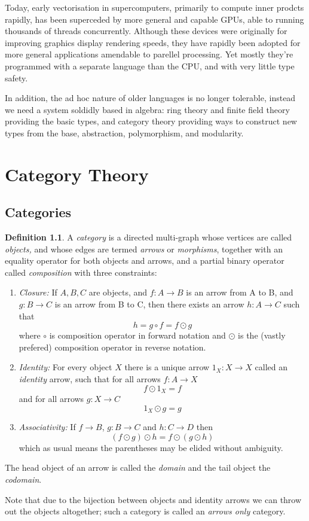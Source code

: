 \documentclass[oneside]{book}
\theoremstyle{plain}
\theoremstyle{definition}
\newtheorem{definition}{Definition}
\theoremstyle{plain}
\begin{document}
Today, early vectorisation in supercomputers, primarily to compute
inner prodcts rapidly, has been superceded by more general and 
capable GPUs, able to running thousands of threads concurrently.
Although these devices were originally for improving graphics display
rendering speeds, they have rapidly been adopted for more general
applications amendable to parellel processing. Yet mostly they're
programmed with a separate language than the CPU, and with very
little type safety.

\begin{ycomment}
In addition, the ad hoc nature of older languages is no longer tolerable,
instead we need a system soldidly based in algebra: ring theory and finite field
theory providing the basic types, and category theory providing ways to
construct new types from the base, abstraction, polymorphism, and modularity.
\end{ycomment}

\chapter{Category Theory}
\section{Categories}
\begin{definition}
A {\em category} is a directed multi-graph whose vertices are called {\em objects,}
and whose edges are termed {\em arrows} or {\em morphisms},
together with an equality operator for both objects and arrows,
and a partial binary operator called {\em composition} with three 
constraints:
\begin{enumerate}
\item {\em Closure:} If $A,B,C$ are objects, and $f:A\rightarrow B$ is an arrow
from A to B, and $g:B\rightarrow C$ is an arrow from B to C,
then there exists an arrow $h:A\rightarrow C$ such that
$$h = g \circ f = f \odot g$$
where $\circ$ is composition operator in forward notation and $\odot$
is the (vastly prefered) composition operator in reverse notation.
\item {\em Identity:} For every object $X$ there is a unique arrow $1_X:X\rightarrow X$
called an {\em identity} arrow, such that for all arrows $f:A\rightarrow X$
$$f \odot 1_X = f$$
and for all arrows $g:X\rightarrow C$
$$1_X \odot g = g$$
\item {\em Associativity:} If $f\rightarrow B$, $g:B\rightarrow C$ and $h:C\rightarrow D$ then
$$(f\odot g) \odot h = f\odot (g \odot h)$$
which as usual means the parentheses may be elided without ambiguity.
\end{enumerate}
The head object of an arrow is called the {\em domain} and the tail
object the {\em codomain}.

Note that due to the bijection between objects and identity arrows
we can throw out the objects altogether; such a category is called
an {\em arrows only} category. 
\end{definition}
\end{document}
